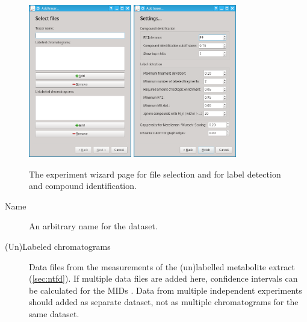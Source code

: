 \documentclass[a4paper,12pt]{scrartcl}
\begin{document}
\begin{figure}[htb]
 \centering
 \includegraphics[width=0.4\textwidth]{./gfx/ss_experiment_files.png}
 \label{fig:experiment_files}
 \includegraphics[width=0.4\textwidth]{./gfx/ss_experiment_settings.png}
 \caption{The experiment wizard page for file selection and for label detection and compound identification.}
 \label{fig:experiment_settings}
\end{figure}

\begin{description}
 \item[Name] 
 An arbitrary name for the dataset.
 \item[(Un)Labeled chromatograms]
 Data files from the measurements of the (un)labelled metabolite extract (\ref{sec:ntfd}). If multiple data files are added here, confidence intervals can be calculated for the MIDs \cite{Hiller2010}. Data from multiple independent experiments should added as separate dataset, not as multiple chromatograms for the same dataset. 
\end{description}
\end{document}
